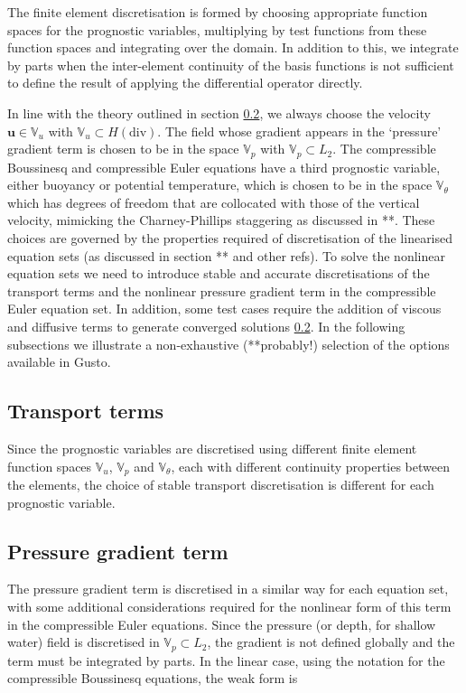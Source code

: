 \documentclass[journal abbreviation, manuscript]{copernicus}
\def\MM#1{\boldsymbol{#1}}
\begin{document}
The finite element discretisation is formed by choosing appropriate
function spaces for the prognostic variables, multiplying by test
functions from these function spaces and integrating over the
domain. In addition to this, we integrate by parts when the
inter-element continuity of the basis functions is not sufficient to
define the result of applying the differential operator directly.

In line with the theory outlined in section \ref{}, we always choose
the velocity $\MM{u} \in \mathbb{V}_u$ with $\mathbb{V}_u \subset
H(\text{div})$. The field whose gradient appears in the `pressure'
gradient term is chosen to be in the space $\mathbb{V}_p$ with
$\mathbb{V}_p \subset L_2$. The compressible Boussinesq and
compressible Euler equations have a third prognostic variable, either
buoyancy or potential temperature, which is chosen to be in the space
$\mathbb{V}_\theta$ which has degrees of freedom that are collocated
with those of the vertical velocity, mimicking the Charney-Phillips
staggering as discussed in **. These choices are governed by the
properties required of discretisation of the linearised equation sets
(as discussed in section ** and other refs). To solve the nonlinear
equation sets we need to introduce stable and accurate discretisations
of the transport terms and the nonlinear pressure gradient term in the
compressible Euler equation set. In addition, some test cases require
the addition of viscous and diffusive terms to generate converged
solutions \ref{}. In the following subsections we illustrate a
non-exhaustive (**probably!) selection of the options available in
Gusto.

\subsection{Transport terms}
Since the prognostic variables are discretised using different finite
element function spaces $\mathbb{V}_u$, $\mathbb{V}_p$ and
$\mathbb{V}_\theta$, each with different continuity properties between
the elements, the choice of stable transport discretisation is
different for each prognostic variable. 


\subsection{Pressure gradient term}
The pressure gradient term is discretised in a similar way for each
equation set, with some additional considerations required for the
nonlinear form of this term in the compressible Euler equations. Since
the pressure (or depth, for shallow water) field is discretised in
$\mathbb{V}_p \subset L_2$, the gradient is not defined globally and
the term must be integrated by parts. In the linear case, using the
notation for the compressible Boussinesq equations, the weak form is
\end{document}
